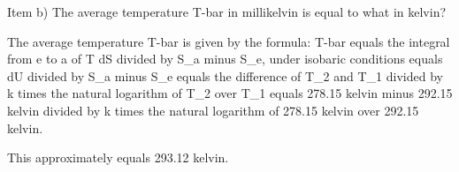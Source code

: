 Item b) The average temperature T-bar in millikelvin is equal to what in kelvin?

The average temperature T-bar is given by the formula:
T-bar equals the integral from e to a of T dS divided by S_a minus S_e, under isobaric conditions equals dU divided by S_a minus S_e equals the difference of T_2 and T_1 divided by k times the natural logarithm of T_2 over T_1 equals 278.15 kelvin minus 292.15 kelvin divided by k times the natural logarithm of 278.15 kelvin over 292.15 kelvin.

This approximately equals 293.12 kelvin.